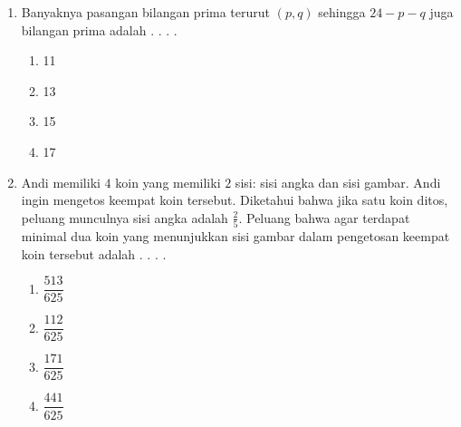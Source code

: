 \documentclass[12pt, a4paper]{scrartcl}
\begin{document}
\begin{enumerate}
    \item Banyaknya pasangan bilangan prima terurut $(p,q)$ sehingga $24-p-q$ juga bilangan prima adalah . . . .
    \begin{enumerate}[label={(\Alph*)}]
        \item 11 \item 13 \item 15 \item 17
    \end{enumerate}

    \item Andi memiliki $4$ koin yang memiliki $2$ sisi: sisi angka dan sisi gambar. Andi ingin mengetos keempat koin tersebut. Diketahui bahwa jika satu koin ditos, peluang munculnya sisi angka adalah $\frac{2}{5}$. Peluang bahwa agar terdapat minimal dua koin yang menunjukkan sisi gambar dalam pengetosan keempat koin tersebut adalah . . . .
    \begin{enumerate}[label={(\Alph*)}]
        \item $\dfrac{513}{625}$ \item $\dfrac{112}{625}$ \item $\dfrac{171}{625}$ \item $\dfrac{441}{625}$
    \end{enumerate}
\end{enumerate}
\end{document}
